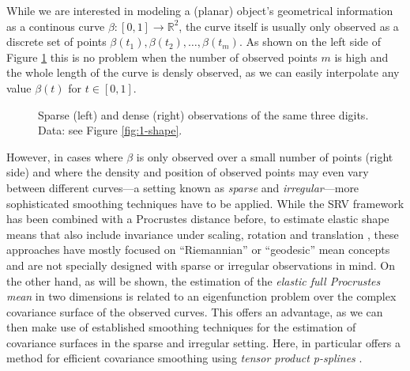 While we are interested in modeling a (planar) object's geometrical information as a continous curve $\beta : [0,1] \rightarrow \mathbb{R}^2$, the curve itself is usually only observed as a discrete set of points $\beta(t_1), \beta(t_2), \dots, \beta(t_m)$.
As shown on the left side of Figure \ref{fig:1-sparse} this is no problem when the number of observed points $m$ is high and the whole length of the curve is densly observed, as we can easily interpolate any value $\beta(t)$ for $t \in [0,1]$.
\begin{figure}
  \centering
  \begin{subfigure}{.48\textwidth}
    \centering
  \end{subfigure}\hfill%
  \begin{subfigure}{.48\textwidth}
    \centering
  \end{subfigure}
  \caption{Sparse (left) and dense (right) observations of the same three digits. Data: see Figure \ref{fig:1-shape}.}
  \label{fig:1-sparse}
\end{figure}
However, in cases where $\beta$ is only observed over a small number of points (right side) and where the density and position of observed points may even vary between different curves---a setting known as \emph{sparse} and \emph{irregular}---more sophisticated smoothing techniques have to be applied.
While the SRV framework has been combined with a Procrustes distance before, to estimate elastic shape means that also include invariance under scaling, rotation and translation \parencite[see][]{SrivastavaEtAl2011}, these approaches have mostly focused on \enquote{Riemannian} or \enquote{geodesic} mean concepts and are not specially designed with sparse or irregular observations in mind.
On the other hand, as will be shown, the estimation of the \emph{elastic full Procrustes mean} in two dimensions is related to an eigenfunction problem over the complex covariance surface of the observed curves.
This offers an advantage, as we can then make use of established smoothing techniques for the estimation of covariance surfaces in the sparse and irregular setting.
Here, in particular \cite{CederbaumScheiplGreven2018} offers a method for efficient covariance smoothing using \emph{tensor product p-splines} \parencite[see e.g.][Chap. 8.2]{FahrmeierEtAl2013}.

